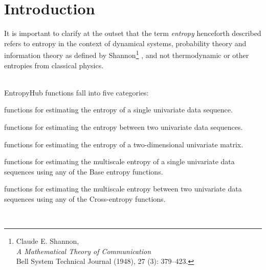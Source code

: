 \documentclass[12pt, a4paper, titlepage, openany]{book}
\newcommand\chapterimage[2][]{%
  \AddToShipoutPictureBG*{%
    \AtTextUpperLeft{%
     \hspace*{\textwidth}%
      \llap{%
            \texttt{[image: \#2]}}}}}%
\begin{document}
\vspace{10cm}
\renewcommand\contentsname{Table of Contents}
\renewcommand{\bibname}{Bibliographie}
\textbf{\tableofcontents}


\mainmatter

\chapter{\textbf{Introduction}}
\chapterimage[width=16cm, height=3cm]{Chapter Banner2.png}

\vspace{35mm}
\begin{tcolorbox}[sharp corners, colback=ehone!20, colframe=ehone, title=\textbf{IMPORTANT NOTE}]
It is important to clarify at the outset that the term \emph{entropy} henceforth described refers to entropy in the context of dynamical systems, probability theory and information theory as defined by Shannon\footnote{Claude E.  Shannon,\\ \indent\indent \emph{A Mathematical Theory of Communication}
\\\indent\indent Bell System Technical Journal (1948), 27 (3): 379–423.}
, and not thermodynamic or other entropies from classical physics.
\end{tcolorbox}
\ \\ EntropyHub functions fall into five categories:\\
\begin{description}[labelsep=5mm, labelwidth=3cm, nosep,style=multiline,leftmargin=45mm]
\item[Base] functions for estimating the entropy of a single univariate data sequence.
\item[Cross] functions for estimating the entropy between two univariate data sequences.
\item[Bidimensional] functions for estimating the entropy of a two-dimensional univariate matrix.
\item[Multiscale] functions for estimating the multiscale entropy of a single univariate data sequences using any of the Base entropy functions.
\item [Multiscale Cross-] functions for estimating the multiscale entropy between two univariate data sequences using any of the Cross-entropy functions.
\end{description}
\ \noindent \newline
\indent{}\\
\end{document}
